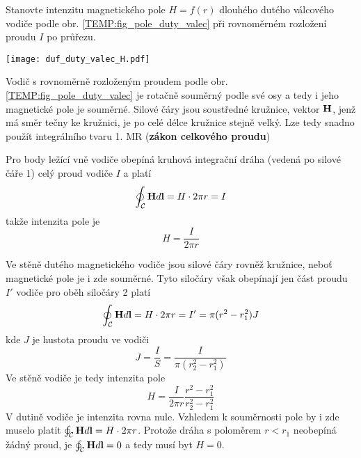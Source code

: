 \begin{mdframed}[style=mdexam]
  \begin{example}
    Stanovte intenzitu magnetického pole $H=f(r)$ dlouhého dutého válcového vodiče podle obr.
    \ref{TEMP:fig_pole_duty_valec} při rovnoměrném rozložení proudu $I$ po průřezu. 
    
    {\centering
      \captionsetup{type=figure}
      \texttt{[image: duf\_duty\_valec\_H.pdf]}
      \label{TEMP:fig_pole_duty_valec}
    \par}
    
    Vodič s rovnoměrně rozloženým proudem podle obr. \ref{TEMP:fig_pole_duty_valec} je rotačně
    souměrný podle své osy a tedy i jeho magnetické pole je souměrné. Silové čáry jsou soustředné
    kružnice, vektor $\mathbf{H}$, jenž má směr tečny ke kružnici, je po celé délce kružnice stejně
    velký. Lze tedy snadno použít integrálního tvaru 1. MR (\textbf{zákon celkového proudu})
    
    Pro body ležící vně vodiče obepíná kruhová integrační dráha (vedená po silové čáře 1) celý
    proud vodiče $I$ a platí
    \begin{equation}\label{TEMP:eq_1MR_duty_valec}
      \oint_{\mathcal{C}}\mathbf{H}d\mathbf{l} = H\cdot 2\pi r = I
    \end{equation}
    takže intenzita pole je
    \begin{equation}\label{TEMP:eq_H_duty_valec}
      H = \frac{I}{2\pi r}
    \end{equation}
    
    Ve stěně dutého magnetického vodiče jsou silové čáry rovněž kružnice, neboť magnetické pole
    je i zde souměrné. Tyto siločáry však obepínají jen část proudu $I'$ vodiče pro oběh siločáry
    2 platí
    \begin{equation}\label{TEMP:eq_1MR_uvnitr_valce}
      \oint_{\mathcal{C}}\mathbf{H}d\mathbf{l} = H\cdot 2\pi r = I' = \pi(r^2-r_1^2)J
    \end{equation}
    kde $J$ je hustota proudu ve vodiči
    \begin{equation}\label{TEMP:eq_J_duty_valec}
      J = \frac{I}{S}= \frac{I}{\pi(r_2^2-r_1^2)}
    \end{equation}
    Ve stěně vodiče je tedy intenzita pole
    \begin{equation}\label{TEMP:eq_H_uvnitr_valce}
      H = \frac{I}{2\pi r}\frac{r^2-r_1^2}{r_2^2-r_1^2}
    \end{equation}
    V dutině vodiče je intenzita rovna nule. Vzhledem k souměrnosti pole by i zde muselo platit
    $\oint_{\mathcal{C}}\mathbf{H}d\mathbf{l} = H\cdot 2\pi r$. Protože dráha s poloměrem $r<r_1$ neobepíná
    žádný proud, je $\oint_{\mathcal{C}}\mathbf{H}d\mathbf{l} = 0$ a tedy musí byt $H = 0$.
  \end{example}    
\end{mdframed}